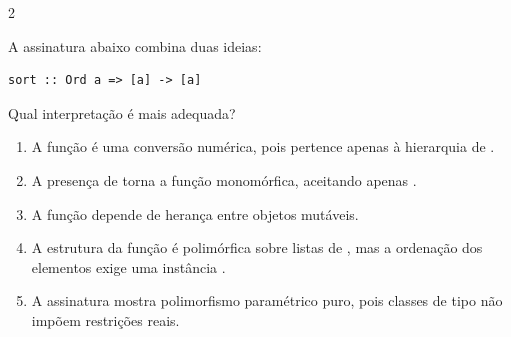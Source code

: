 \documentclass[a4paper,10pt,brazil]{article}
\begin{document}
\begin{multicols}{2}
\begin{flushright}
\end{flushright}
A assinatura abaixo combina duas ideias:

\begin{verbatim}
sort :: Ord a => [a] -> [a]
\end{verbatim}

Qual interpretação é mais adequada?

\begin{enumerate}
  \item A função é uma conversão numérica, pois  pertence apenas à hierarquia de .
  \item A presença de  torna a função monomórfica, aceitando apenas .
  \item A função depende de herança entre objetos mutáveis.
  \item A estrutura da função é polimórfica sobre listas de , mas a ordenação dos elementos exige uma instância .
  \item A assinatura mostra polimorfismo paramétrico puro, pois classes de tipo não impõem restrições reais.

\end{enumerate}


\end{multicols}
\end{document}
